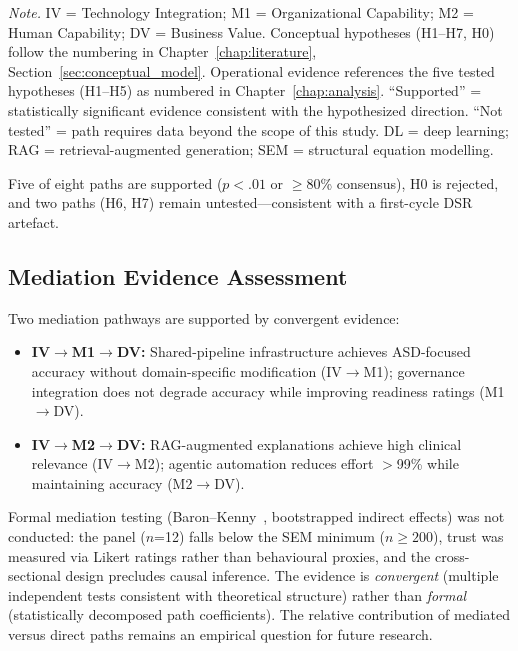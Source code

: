 \vspace{0.5em}\noindent\textit{Note.} IV = Technology Integration; M1 = Organizational Capability; M2 = Human Capability; DV = Business Value. Conceptual hypotheses (H1--H7, H0) follow the numbering in Chapter~\ref{chap:literature}, Section~\ref{sec:conceptual_model}. Operational evidence references the five tested hypotheses (H1--H5) as numbered in Chapter~\ref{chap:analysis}. ``Supported'' = statistically significant evidence consistent with the hypothesized direction. ``Not tested'' = path requires data beyond the scope of this study. DL = deep learning; RAG = retrieval-augmented generation; SEM = structural equation modelling.

\noindent Five of eight paths are supported ($p < .01$ or $\geq$80\% consensus), H0 is rejected, and two paths (H6, H7) remain untested---consistent with a first-cycle DSR artefact.

\subsection{Mediation Evidence Assessment}

Two mediation pathways are supported by convergent evidence:

\begin{itemize}
    \item \textbf{IV$\to$M1$\to$DV:} Shared-pipeline infrastructure achieves ASD-focused accuracy without domain-specific modification (IV$\to$M1); governance integration does not degrade accuracy while improving readiness ratings (M1$\to$DV).
    \item \textbf{IV$\to$M2$\to$DV:} RAG-augmented explanations achieve high clinical relevance (IV$\to$M2); agentic automation reduces effort $>$99\% while maintaining accuracy (M2$\to$DV).
\end{itemize}

\noindent Formal mediation testing (Baron--Kenny~\cite{baron1986moderator}, bootstrapped indirect effects) was not conducted: the panel ($n$=12) falls below the SEM minimum ($n \geq 200$), trust was measured via Likert ratings rather than behavioural proxies, and the cross-sectional design precludes causal inference. The evidence is \textit{convergent} (multiple independent tests consistent with theoretical structure) rather than \textit{formal} (statistically decomposed path coefficients). The relative contribution of mediated versus direct paths remains an empirical question for future research.


